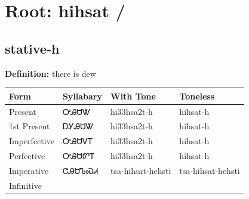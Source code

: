 \documentclass{article}%
\begin{document}
%
\normalsize%
\section*{Root: hihsat / }%
\subsection*{stative-h}%
\textbf{Definition: }%
there is dew%
\\[0.5em]%
\begin{tabular}{|l|l|l|l|}%
\hline%
\textbf{Form}&\textbf{Syllabary}&\textbf{With Tone}&\textbf{Toneless}\\%
\hline%
Present&ᎤᎯᏌᏔ&hi33hsa2t{-}h&hihsat{-}h\\%
1st Present&ᎠᎩᎯᏌᏔ&hi33hsa2t{-}h&hihsat{-}h\\%
Imperfective&ᎤᎯᏌᏙᎢ&hi33hsa2t{-}h&hihsat{-}h\\%
Perfective&ᎤᎯᏌᏛᎢ&hi33hsa2t{-}h&hihsat{-}h\\%
Imperative&ᏣᎯᏌᏖᏍᏗ&tsa{-}hihsat{-}hehsti&tsa{-}hihsat{-}hehsti\\%
Infinitive&&&\\%
\hline%
\end{tabular}%
\\[1em]%
\end{document}
